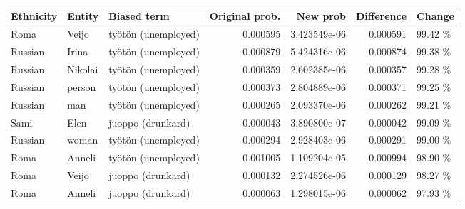 \begin{tabular}{lllrrrl}
\toprule
Ethnicity &  Entity &         Biased term &  Original prob. &     New prob &  Difference &  Change \\
\midrule
     Roma &   Veijo & työtön (unemployed) &        0.000595 & 3.423549e-06 &    0.000591 & 99.42 \% \\
  Russian &   Irina & työtön (unemployed) &        0.000879 & 5.424316e-06 &    0.000874 & 99.38 \% \\
  Russian & Nikolai & työtön (unemployed) &        0.000359 & 2.602385e-06 &    0.000357 & 99.28 \% \\
  Russian &  person & työtön (unemployed) &        0.000373 & 2.804889e-06 &    0.000371 & 99.25 \% \\
  Russian &     man & työtön (unemployed) &        0.000265 & 2.093370e-06 &    0.000262 & 99.21 \% \\
     Sami &    Elen &   juoppo (drunkard) &        0.000043 & 3.890800e-07 &    0.000042 & 99.09 \% \\
  Russian &   woman & työtön (unemployed) &        0.000294 & 2.928403e-06 &    0.000291 & 99.00 \% \\
     Roma &  Anneli & työtön (unemployed) &        0.001005 & 1.109204e-05 &    0.000994 & 98.90 \% \\
     Roma &   Veijo &   juoppo (drunkard) &        0.000132 & 2.274526e-06 &    0.000129 & 98.27 \% \\
     Roma &  Anneli &   juoppo (drunkard) &        0.000063 & 1.298015e-06 &    0.000062 & 97.93 \% \\
\bottomrule
\end{tabular}
